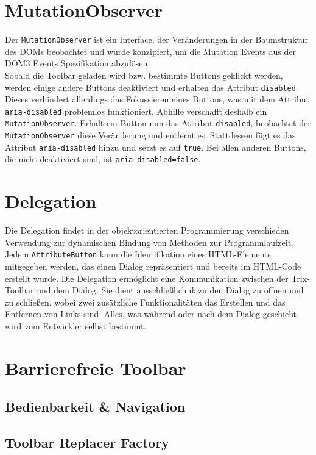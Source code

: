 \section{MutationObserver}
Der \texttt{MutationObserver} ist ein Interface, der Veränderungen in der Baumstruktur des DOMs beobachtet und wurde konzipiert, um die Mutation Events aus der DOM3 Events Spezifikation abzulösen.\\
Sobald die Toolbar geladen wird bzw. bestimmte Buttons geklickt werden, werden einige andere Buttons deaktiviert und erhalten das Attribut \texttt{disabled}. Dieses verhindert allerdings das Fokussieren eines Buttons, was mit dem Attribut \texttt{aria-disabled} problemlos funktioniert. Abhilfe verschafft deshalb ein \texttt{MutationObserver}. Erhält ein Button nun das Attribut \texttt{disabled}, beobachtet der \texttt{MutationObserver} diese Veränderung und entfernt es. Stattdessen fügt es das Attribut \texttt{aria-disabled} hinzu und setzt es auf \texttt{true}. Bei allen anderen Buttons, die nicht deaktiviert sind, ist \texttt{aria-disabled=false}.

\section{Delegation}
Die Delegation findet in der objektorientierten Programmierung verschieden Verwendung zur dynamischen Bindung von Methoden zur Programmlaufzeit.\\
Jedem \texttt{AttributeButton} kann die Identifikation eines HTML-Elements mitgegeben werden, das einen Dialog repräsentiert und bereits im HTML-Code erstellt wurde. Die Delegation ermöglicht eine Kommunikation zwischen der Trix-Toolbar und dem Dialog. Sie dient ausschließlich dazu den Dialog zu öffnen und zu schließen, wobei zwei zusätzliche Funktionalitäten das Erstellen und das Entfernen von Links sind. Alles, was während oder nach dem Dialog geschieht, wird vom Entwickler selbst bestimmt.

\section{Barrierefreie Toolbar}
\subsection{Bedienbarkeit \& Navigation}

\subsection{Toolbar Replacer Factory}


